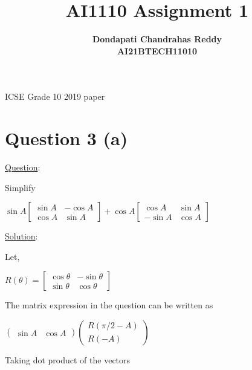 \documentclass[journal,12pt,twocolumn]{IEEEtran}
\newcommand{\myvec}[1]{\ensuremath{\begin{pmatrix}#1\end{pmatrix}}}
\begin{document}
\title{\textbf{AI1110 Assignment 1} }
\author{\textbf{Dondapati Chandrahas Reddy}\\\textbf{AI21BTECH11010}}
\maketitle
\begin{center}
{ ICSE Grade 10 2019 paper}\end{center}\par
{ \section {Question 3 (a) \newline}}
{\Large \underline{Question}:\newline}

Simplify 
\begin{center}$\sin A\left [\begin{array}{cc}\sin A &  -\cos A \\
\cos A & \sin A\end{array}\right ]+\cos A\left [\begin{array}{cc}\cos A &  \sin A \\
-\sin A & \cos A\end{array}\right ]$\newline\end{center}\par

{\Large \underline{Solution}: \newline }\par
Let,
\begin{center}$R(\theta) =\left [\begin{array}{cc}\cos \theta &  -\sin \theta \\
\sin \theta & \cos \theta\end{array}\right ]$\newline\end{center}\par

The matrix expression in the question can be written as

\begin{center}
$\myvec{\sin A & \cos A} \myvec{R(\pi/2 - A) \\ R( -A)}$\newline 
\end{center}\par

Taking dot product of the vectors
\end{document}
